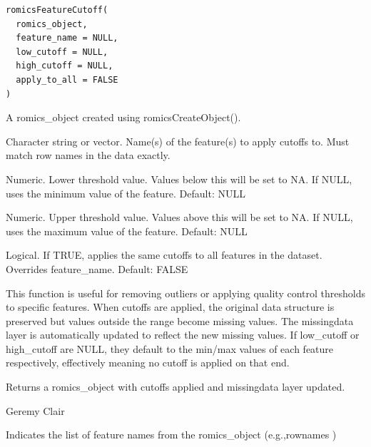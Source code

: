 \documentclass[a4paper]{book}
\begin{document}
%
\begin{Usage}
\begin{verbatim}
romicsFeatureCutoff(
  romics_object,
  feature_name = NULL,
  low_cutoff = NULL,
  high_cutoff = NULL,
  apply_to_all = FALSE
)
\end{verbatim}
\end{Usage}
%
\begin{Arguments}
\begin{ldescription}
\item[\code{romics\_object}] A romics\_object created using romicsCreateObject().

\item[\code{feature\_name}] Character string or vector. Name(s) of the feature(s) to apply cutoffs to. Must match row names in the data exactly.

\item[\code{low\_cutoff}] Numeric. Lower threshold value. Values below this will be set to NA. If NULL, uses the minimum value of the feature. Default: NULL

\item[\code{high\_cutoff}] Numeric. Upper threshold value. Values above this will be set to NA. If NULL, uses the maximum value of the feature. Default: NULL

\item[\code{apply\_to\_all}] Logical. If TRUE, applies the same cutoffs to all features in the dataset. Overrides feature\_name. Default: FALSE
\end{ldescription}
\end{Arguments}
%
\begin{Details}
This function is useful for removing outliers or applying quality control thresholds to specific features.
When cutoffs are applied, the original data structure is preserved but values outside the range become missing values.
The missingdata layer is automatically updated to reflect the new missing values.
If low\_cutoff or high\_cutoff are NULL, they default to the min/max values of each feature respectively,
effectively meaning no cutoff is applied on that end.
\end{Details}
%
\begin{Value}
Returns a romics\_object with cutoffs applied and missingdata layer updated.
\end{Value}
%
\begin{Author}
Geremy Clair
\end{Author}
%
\begin{Description}
Indicates the list of feature names from the romics\_object (e.g.,rownames )
\end{Description}
\end{document}
